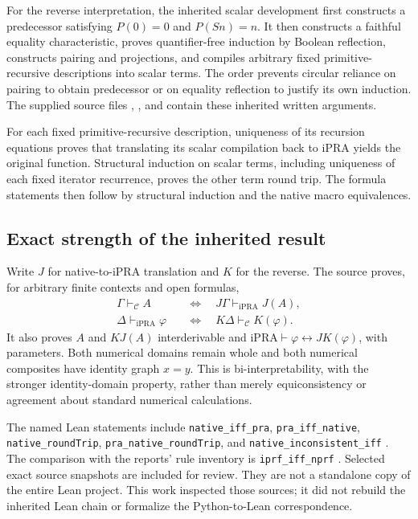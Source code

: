 \documentclass[11pt]{article}
\theoremstyle{definition}\newtheorem{definition}[theorem]{Definition}
\theoremstyle{remark}\newtheorem{remark}[theorem]{Remark}
\newcommand{\iPRA}{\mathrm{iPRA}}
\newcommand{\C}{\mathcal C}
\begin{document}
For the reverse interpretation, the inherited scalar development first
constructs a predecessor satisfying $P(0)=0$ and $P(Sn)=n$. It then
constructs a faithful equality characteristic, proves quantifier-free
induction by Boolean reflection, constructs pairing and projections, and
compiles arbitrary fixed primitive-recursive descriptions into scalar
terms. The order prevents circular reliance on pairing to obtain
predecessor or on equality reflection to justify its own induction.
The supplied source files ,
, and  contain
these inherited written arguments.

For each fixed primitive-recursive description, uniqueness of its
recursion equations proves that translating its scalar compilation back
to iPRA yields the original function. Structural induction on scalar terms,
including uniqueness of each fixed iterator recurrence, proves the other
term round trip. The formula statements then follow by structural induction
and the native macro equivalences.

\subsection{Exact strength of the inherited result}

Write $J$ for native-to-iPRA translation and $K$ for the reverse.
The source proves, for arbitrary finite contexts and open formulas,
\begin{align*}
 \Gamma\vdash_{\C}A&\quad\Longleftrightarrow\quad
       J\Gamma\vdash_{\iPRA}J(A),\\
 \Delta\vdash_{\iPRA}\varphi&\quad\Longleftrightarrow\quad
       K\Delta\vdash_{\C}K(\varphi).
\end{align*}
It also proves $A$ and $KJ(A)$ interderivable and
$\iPRA\vdash\varphi\leftrightarrow JK(\varphi)$, with parameters.
Both numerical domains remain whole and both numerical composites have
identity graph $x=y$. This is bi-interpretability, with the stronger
identity-domain property, rather than merely equiconsistency or
agreement about standard numerical calculations.

The named Lean statements include \texttt{native\_iff\_pra},
\texttt{pra\_iff\_native}, \texttt{native\_roundTrip},
\texttt{pra\_native\_roundTrip}, and
\texttt{native\_inconsistent\_iff} \cite{bridge}. The comparison with
the reports' rule inventory is \texttt{iprf\_iff\_nprf}
\cite{inherited}. Selected exact source snapshots are included for review.
They are not a standalone copy of the entire Lean project. This work
inspected those sources; it did not rebuild the inherited Lean chain or
formalize the Python-to-Lean correspondence.
\end{document}
